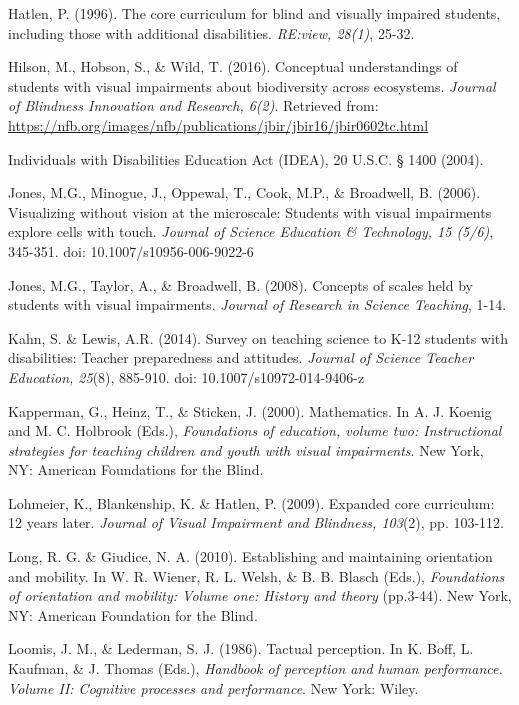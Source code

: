 \documentclass[11.5pt]{sig-alternate} %
\begin{document}
Hatlen, P. (1996). The core curriculum for blind and visually impaired students, including those with additional disabilities.  \textit{RE:view, 28(1)}, 25-32.

Hilson, M., Hobson, S., \& Wild, T. (2016). Conceptual understandings of students with visual impairments about biodiversity across ecosystems.  \textit{Journal of Blindness Innovation and Research, 6(2)}.  Retrieved from: \url{https://nfb.org/images/nfb/publications/jbir/jbir16/jbir0602tc.html}

Individuals with Disabilities Education Act (IDEA), 20 U.S.C. § 1400 (2004).

Jones, M.G., Minogue, J., Oppewal, T., Cook, M.P., \& Broadwell, B. (2006). Visualizing without vision at the microscale:  Students with visual impairments explore cells with touch. \textit{Journal of Science Education \& Technology, 15 (5/6)}, 345-351. doi: 10.1007/s10956-006-9022-6

Jones, M.G., Taylor, A., \& Broadwell, B. (2008). Concepts of scales held by students with visual impairments.  \textit{Journal of Research in Science Teaching}, 1-14.

Kahn, S. \& Lewis, A.R. (2014). Survey on teaching science to K-12 students with disabilities:  Teacher preparedness and attitudes. \textit{Journal of Science Teacher Education, 25}(8), 885-910. doi: 10.1007/s10972-014-9406-z 

Kapperman, G., Heinz, T., \& Sticken, J. (2000). Mathematics.  In A. J. Koenig and M. C. Holbrook (Eds.), \textit{Foundations of education, volume two:  Instructional strategies for teaching children and youth with visual impairments}.  New York, NY:  American Foundations for the Blind.

Lohmeier, K., Blankenship, K. \& Hatlen, P. (2009). Expanded core curriculum:  12 years later. 	\textit{Journal of Visual Impairment and Blindness, 103}(2), pp. 103-112.

Long, R. G. \& Giudice, N. A. (2010). Establishing and maintaining orientation and mobility.  In W. R. Wiener, R. L. Welsh, \& B. B. Blasch (Eds.), \textit{Foundations of orientation and mobility:  Volume one:  History and theory} (pp.3-44).  New York, NY:  American Foundation for the Blind.

Loomis, J. M., \& Lederman, S. J. (1986). Tactual perception.  In K. Boff, L. Kaufman, \& J. Thomas (Eds.), \textit{Handbook of perception and human performance.  Volume II:  Cognitive processes and performance}.  New York: Wiley. 
\end{document}
